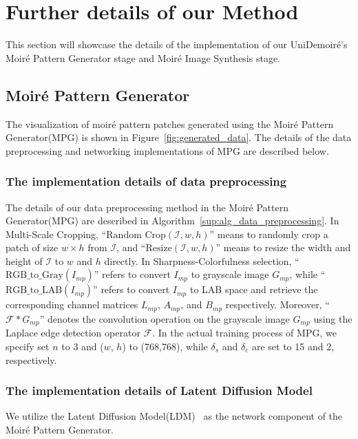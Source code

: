 \section{Further details of our Method}
\label{sec:sup_method}



This section will showcase the details of the implementation of our UniDemoiré's Moiré Pattern Generator stage and Moiré Image Synthesis stage.

\subsection{Moiré Pattern Generator}
The visualization of moiré pattern patches generated using the Moiré Pattern Generator(MPG) is shown in Figure~\ref{fig:generated_data}. The details of the data preprocessing and networking implementations of MPG are described below.



\subsubsection{The implementation details of data preprocessing} The details of our data preprocessing method in the Moiré Pattern Generator(MPG) are described in Algorithm~\ref{sup:alg_data_preprocessing}. In Multi-Scale Cropping, ``$\text{Random Crop}(\mathcal{I},w,h)$'' means to randomly crop a patch of size $w\times h$ from $\mathcal{I}$, and ``$\text{Resize}(\mathcal{I},w,h)$'' means to resize the width and height of $\mathcal{I}$ to $w$ and $h$ directly. In Sharpness-Colorfulness selection, ``$\text{RGB\_to\_Gray}(I_{mp})$'' refers to convert $I_{mp}$ to grayscale image $G_{mp}$, while ``$\text{RGB\_to\_LAB}(I_{mp})$'' refers to convert $I_{mp}$ to LAB space and retrieve the corresponding channel matrices $L_{mp}$, $A_{mp}$, and $B_{mp}$ respectively. Moreover, ``$\mathcal{F} \ast G_{mp}$'' denotes the convolution operation on the grayscale image $G_{mp}$ using the Laplace edge detection operator $\mathcal{F}$. 
In the actual training process of MPG, we specify set $n$ to 3 and ($w$, $h$) to (768,768), while $\delta_s$ and $\delta_c$ are set to 15 and 2, respectively.

\subsubsection{The implementation details of Latent Diffusion Model} 
We utilize the Latent Diffusion Model(LDM)~\cite{Rombach2022LDM} as the network component of the Moiré Pattern Generator. 

